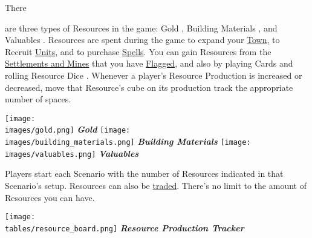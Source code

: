 
\begin{multicols}{2}

\hypertarget{Resources}{There} are three types of Resources in the game: Gold , Building Materials , and Valuables .
Resources are spent during the game to expand your \hyperlink{Town}{Town}, to Recruit \hyperlink{Units}{Units}, and to purchase \hyperlink{spells}{Spells}.
You can gain Resources from the \hyperlink{Mines}{Settlements and Mines} that you have \hyperlink{Categories}{Flagged}, and also by playing Cards and rolling Resource Dice .
Whenever a player's Resource Production is increased or decreased, move that Resource's cube on its production track the appropriate number of spaces.\par
\begin{multicols}{3}
  \centering
  \vspace*{\fill}
  \texttt{[image: \\images/gold.png]}
  \footnotesize\textcolor{darkcandyapplered}{\textit{\textbf{Gold \phantom{Materials}}}}
  \columnbreak
  \vspace*{\fill}
  \texttt{[image: \\images/building\_materials.png]}
  \footnotesize\textcolor{darkcandyapplered}{\textit{\textbf{Building Materials}}}
  \columnbreak
  \vspace*{\fill}
  \texttt{[image: \\images/valuables.png]}
  \footnotesize\textcolor{darkcandyapplered}{\textit{\textbf{Valuables \phantom{Materials}}}}
\end{multicols}
Players start each Scenario with the number of Resources indicated in that Scenario’s setup.
Resources can also be \hyperlink{Trading}{traded}.
There's no limit to the amount of Resources you can have.

\vspace*{\fill}

\columnbreak

\begin{center}
  \texttt{[image: \\tables/resource\_board.png]}
  \footnotesize\textcolor{darkcandyapplered}{\textbf{\textit{Resource Production Tracker}}}
\end{center}
\bigskip


\end{multicols}
